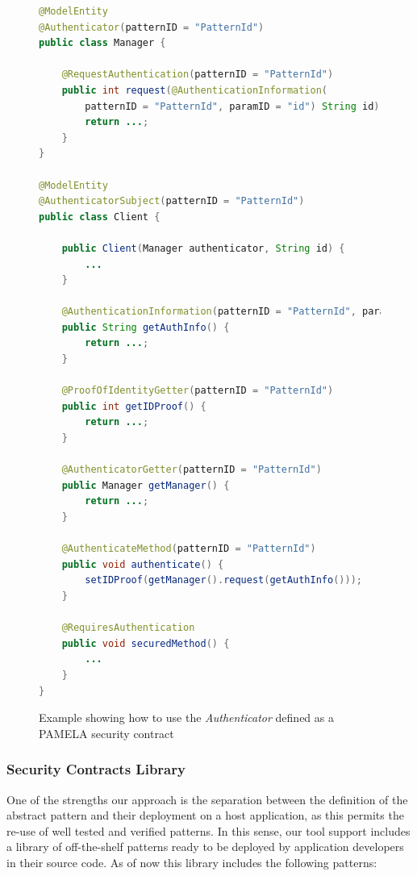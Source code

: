 \begin{figure}
    \centering
\begin{lstlisting}[language=Java,basicstyle=\ttfamily\footnotesize]
@ModelEntity 
@Authenticator(patternID = "PatternId")
public class Manager {

	@RequestAuthentication(patternID = "PatternId")
	public int request(@AuthenticationInformation(
        patternID = "PatternId", paramID = "id") String id) {
		return ...;
	}
}

@ModelEntity
@AuthenticatorSubject(patternID = "PatternId")
public class Client {

	public Client(Manager authenticator, String id) {
		...
	}

	@AuthenticationInformation(patternID = "PatternId", paramID = "id")
	public String getAuthInfo() {
		return ...;
	}

	@ProofOfIdentityGetter(patternID = "PatternId")
	public int getIDProof() {
		return ...;
	}

	@AuthenticatorGetter(patternID = "PatternId")
	public Manager getManager() {
		return ...;
	}

	@AuthenticateMethod(patternID = "PatternId")
	public void authenticate() {
		setIDProof(getManager().request(getAuthInfo()));
	}

	@RequiresAuthentication
	public void securedMethod() {
		...
	}
}
\end{lstlisting}
    \caption{Example showing how to use the \textit{Authenticator} defined as a PAMELA security contract}
    \label{fig:ExampleOfAuthenticatorPattern}
\end{figure}




\subsubsection{Security Contracts Library}

One of the strengths our approach is the separation between the definition of the abstract pattern and their deployment on a host application, as this permits the re-use of well tested and verified patterns. In this sense, our tool support includes a library of off-the-shelf patterns ready to be deployed by application developers in their source code. As of now this library includes the following patterns:

